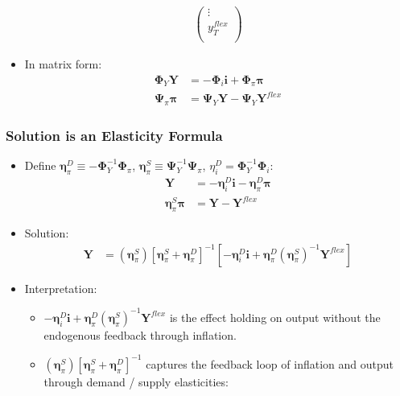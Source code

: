 \documentclass[english,xcolor=svgnames]{beamer}
\begin{document}
\begin{frame}
\begin{itemize}
\begin{align*}
\begin{pmatrix}
        		\vdots \\
        		y_T^{flex} \\
        	\end{pmatrix}
        \end{align*}
        \item In matrix form:
        \begin{align*}
            \bm{\Phi}_Y \bm{Y} &=  -\bm{\Phi}_i \bm{i}  +  \bm{\Phi}_\pi \bm{\pi}\\
            \bm{\Psi}_\pi \bm{\pi} &=  \bm{\Psi}_Y \bm{Y}  -  \bm{\Psi}_Y \bm{Y}^{flex} 
        \end{align*}
    \end{itemize}
\end{frame}


\begin{frame}
    \frametitle{Solution is an Elasticity Formula}
    \begin{itemize}
    	\item Define $\bm{\eta}_\pi^D\equiv -\bm{\Phi}_Y^{-1}\bm{\Phi}_\pi$, $\bm{\eta}_\pi^S\equiv \bm{\Psi}_Y^{-1} \bm{\Psi}_\pi$, $\eta_i^D = \bm{\Phi}_Y^{-1}\bm{\Phi}_i$:
        \begin{align*}
             \bm{Y} &=  - \bm{\eta}_i^D \bm{i}  -  \bm{\eta}_\pi^D \bm{\pi}\\
            \bm{\eta}_\pi^{S} \bm{\pi} &=   \bm{Y}  - \bm{Y}^{flex} 
        \end{align*}
        \item Solution:
        \begin{align*}
             \bm{Y} &= (\bm{\eta}_\pi^{S}) [\bm{\eta}_\pi^{S} +  \bm{\eta}_\pi^{D} ]^{-1}  [- \bm{\eta}_i^D \bm{i}  +  \bm{\eta}_\pi^{D} (\bm{\eta}_\pi^{S})^{-1} \bm{Y}^{flex}] 
        \end{align*}
        \item Interpretation:
        \begin{itemize}
        	\item $ - \bm{\eta}_i^D \bm{i}  +  \bm{\eta}_\pi^{D} (\bm{\eta}_\pi^{S})^{-1} \bm{Y}^{flex}$ is the effect holding on output without the endogenous feedback through inflation.
        	\item $(\bm{\eta}_\pi^{S}) [\bm{\eta}_\pi^{S} +  \bm{\eta}_\pi^{D} ]^{-1}$ captures the feedback loop of inflation and output through demand / supply elasticities:

\end{itemize}
\end{itemize}
\end{frame}
\end{document}
